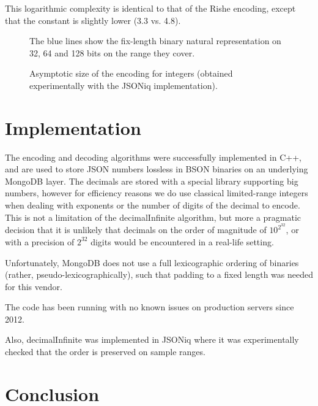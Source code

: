 \documentclass{acm_proc_article-sp}
\begin{document}
This logarithmic complexity is identical to that of the Rishe encoding, except that the constant is slightly lower (3.3 vs. 4.8).


\begin{figure}
\label{figure-size}
\caption{Asymptotic size of the encoding for integers (obtained experimentally with the JSONiq implementation).}
The blue lines show the fix-length binary natural representation on 32, 64 and 128 bits on the range they cover.

\end{figure}

\section{Implementation}
\label{section-implementation}
The encoding and decoding algorithms were successfully implemented in C++, and are used to store JSON numbers lossless in BSON binaries on an underlying MongoDB layer. The decimals are stored with a special library supporting big numbers, however for efficiency reasons we do use classical limited-range integers when dealing with exponents or the number of digits of the decimal to encode. This is not a limitation of the decimalInfinite algorithm, but more a pragmatic decision that it is unlikely that decimals on the order of magnitude of $10^{2^{32}}$, or with a precision of $2^{32}$ digits would be encountered in a real-life setting.

Unfortunately, MongoDB does not use a full lexicographic ordering of binaries (rather, pseudo-lexicographically), such that padding to a fixed length was needed for this vendor.

The code has been running with no known issues on production servers since 2012.

Also, decimalInfinite was implemented in JSONiq \cite{JSONiq} where it was experimentally checked that the order is preserved on sample ranges.

\section{Conclusion}
\end{document}
